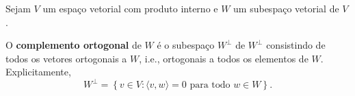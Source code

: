 \begin{definition}
	Sejam $V$ um espaço vetorial com produto interno e $W$ um subespaço vetorial de $V$.
	
	O \textbf{complemento ortogonal} de $W$ é o subespaço $W^\perp$ de $W^\perp$ consistindo de todos os vetores ortogonais a $W$, i.e., ortogonais a todos os elementos de $W$. Explicitamente,
	\[W^\perp=\left\{v\in V:\langle v,w\rangle=0\text{ para todo }w\in W\right\}.\]
\end{definition}